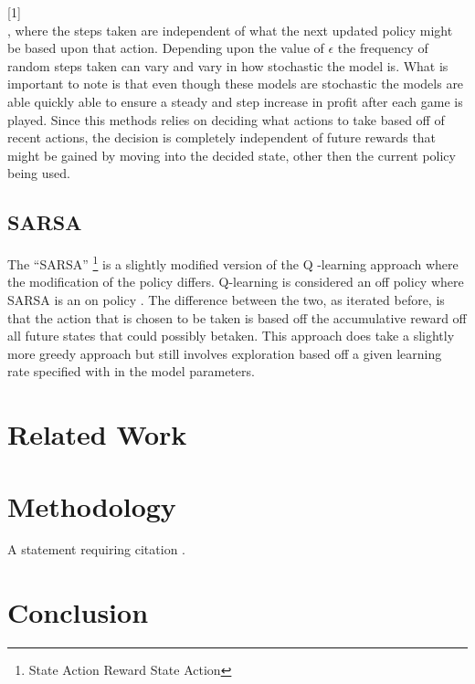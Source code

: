 \documentclass[twoside,twocolumn]{article}
\begin{document}
[1]\\
, where the steps taken are independent of what the next updated policy might be based upon that action.  Depending upon the value of $\epsilon$ the frequency of random steps taken can vary and vary in how stochastic the model is.  What is important to note is that even though these models are stochastic the models are able quickly able to ensure a steady and step increase in profit after each game is played. Since this methods relies on deciding what actions to take based off of recent actions, the decision is completely independent of future rewards that might be gained by moving into the decided state, other then the current policy being used. 


\subsection{SARSA}

\indent The “SARSA” \footnote{State Action Reward State Action} is a slightly modified version of the Q -learning approach where the modification of the policy differs. Q-learning is considered an off policy where SARSA is an on policy \cite{GeeksforGeeks:2021dg}.  The difference between the two, as iterated before, is that the action that is chosen to be taken is based off the accumulative reward off all future states that could possibly betaken.  This approach does take a slightly more greedy approach but still involves exploration based off a given learning rate specified with in the model parameters. 


\section{Related Work}


\section{Methodology}

A statement requiring citation \cite{Figueredo:2009dg}.


\section{Conclusion}
\end{document}
